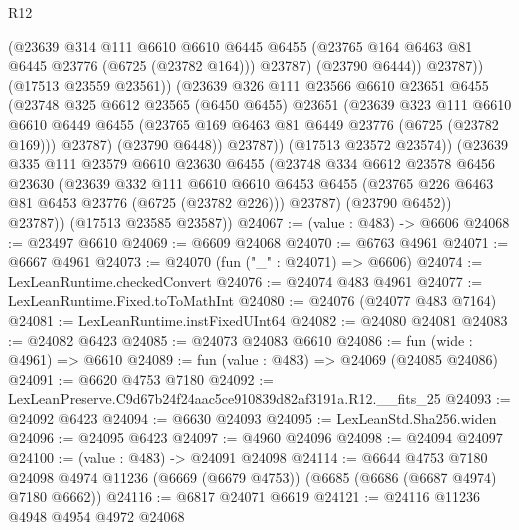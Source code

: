 \begin{lexlean}{R12}
\begin{coremodule}
                    (@23639
                      @314
                      @111
                      @6610
                      @6610
                      @6445
                      @6455
                      (@23765 @164 @6463 @81 @6445 @23776 (@6725 (@23782 @164)))
                      @23787)
                    (@23790 @6444))
                  @23787))
              (@17513 @23559 @23561))
            (@23639
              @326
              @111
              @23566
              @6610
              @23651
              @6455
              (@23748
                @325
                @6612
                @23565
                (@6450 @6455)
                @23651
                (@23639
                  @323
                  @111
                  @6610
                  @6610
                  @6449
                  @6455
                  (@23765 @169 @6463 @81 @6449 @23776 (@6725 (@23782 @169)))
                  @23787)
                (@23790 @6448))
              @23787))
          (@17513 @23572 @23574))
        (@23639
          @335
          @111
          @23579
          @6610
          @23630
          @6455
          (@23748
            @334
            @6612
            @23578
            @6456
            @23630
            (@23639
              @332
              @111
              @6610
              @6610
              @6453
              @6455
              (@23765 @226 @6463 @81 @6453 @23776 (@6725 (@23782 @226)))
              @23787)
            (@23790 @6452))
          @23787))
      (@17513 @23585 @23587))
@24067 := (value : @483) -> @6606
@24068 := @23497 @6610
@24069 := @6609 @24068
@24070 := @6763 @4961
@24071 := @6667 @4961
@24073 := @24070 (fun ("_" : @24071) => @6606)
@24074 := LexLeanRuntime.checkedConvert
@24076 := @24074 @483 @4961
@24077 := LexLeanRuntime.Fixed.toToMathInt
@24080 := @24076 (@24077 @483 @7164)
@24081 := LexLeanRuntime.instFixedUInt64
@24082 := @24080 @24081
@24083 := @24082 @6423
@24085 := @24073 @24083 @6610
@24086 := fun (wide : @4961) => @6610
@24089 := fun (value : @483) => @24069 (@24085 @24086)
@24091 := @6620 @4753 @7180
@24092 := LexLeanPreserve.C9d67b24f24aac5ce910839d82af3191a.R12.__fits_25
@24093 := @24092 @6423
@24094 := @6630 @24093
@24095 := LexLeanStd.Sha256.widen
@24096 := @24095 @6423
@24097 := @4960 @24096
@24098 := @24094 @24097
@24100 := (value : @483) -> @24091 @24098
@24114 := @6644
    @4753
    @7180
    @24098
    @4974
    @11236
    (@6669 (@6679 @4753))
    (@6685 (@6686 (@6687 @4974) @7180 @6662))
@24116 := @6817 @24071 @6619
@24121 := @24116 @11236 @4948 @4954 @4972 @24068

\end{coremodule}
\end{lexlean}
